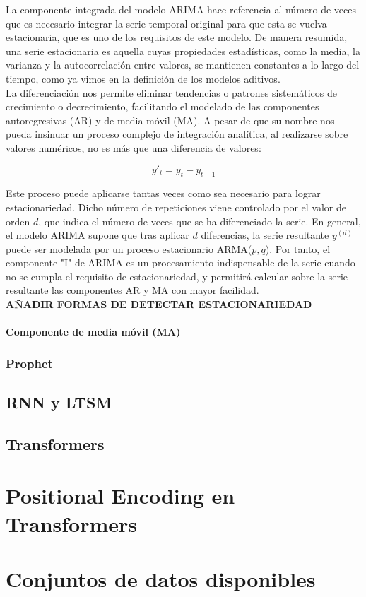 	
	La componente integrada del modelo ARIMA hace referencia al número de veces que es necesario integrar la serie temporal original para que esta se vuelva estacionaria, que es uno de los requisitos de este modelo.  De manera resumida, una serie estacionaria es aquella cuyas propiedades estadísticas, como la media, la varianza y la autocorrelación entre valores, se mantienen constantes a lo largo del tiempo,  como ya vimos en la definición de los modelos aditivos.\\
	
	La diferenciación nos permite eliminar tendencias o patrones sistemáticos de crecimiento o decrecimiento, facilitando el modelado de las componentes autoregresivas (AR) y de media móvil (MA). A pesar de que su nombre nos pueda insinuar un proceso complejo de integración analítica, al realizarse sobre valores numéricos, no es más que una diferencia de valores:
	
	\[
	y'_t = y_t - y_{t-1}
	\]
	
	Este proceso puede aplicarse tantas veces como sea necesario para lograr estacionariedad. Dicho número de repeticiones viene controlado por el valor de orden \( d \), que indica el número de veces que se ha diferenciado la serie. En general, el modelo ARIMA supone que tras aplicar \( d \) diferencias, la serie resultante \( y^{(d)} \) puede ser modelada por un proceso estacionario ARMA(\(p,q\)). Por tanto, el componente "I" de ARIMA es un procesamiento indispensable de la serie cuando no se cumpla el requisito de estacionariedad, y permitirá calcular sobre la serie resultante las componentes AR y MA con mayor facilidad. \\
	
\textbf{	AÑADIR FORMAS DE DETECTAR ESTACIONARIEDAD}
	
	\paragraph{Componente de media móvil (MA)}
	\mbox{}
	


\subsubsection{Prophet}

\subsection{RNN y LTSM}
\subsection{Transformers}

\section{Positional Encoding en Transformers}

\section{Conjuntos de datos disponibles}
